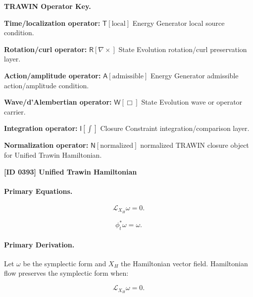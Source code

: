 \par\vspace{0.45\baselineskip}
\noindent\begin{minipage}[t]{\linewidth}
\begingroup
\small
\raggedright
\textbf{TRAWIN Operator Key.}\par
\noindent\textbf{Time/localization operator:} $\mathsf{T}\!\left[\mathrm{local}\right]$ Energy Generator local source condition.\par
\noindent\textbf{Rotation/curl operator:} $\mathsf{R}\!\left[\nabla\times\right]$ State Evolution rotation/curl preservation layer.\par
\noindent\textbf{Action/amplitude operator:} $\mathsf{A}\!\left[\mathrm{admissible}\right]$ Energy Generator admissible action/amplitude condition.\par
\noindent\textbf{Wave/d'Alembertian operator:} $\mathsf{W}\!\left[\Box\right]$ State Evolution wave or operator carrier.\par
\noindent\textbf{Integration operator:} $\mathsf{I}\!\left[\int\right]$ Closure Constraint integration/comparison layer.\par
\noindent\textbf{Normalization operator:} $\mathsf{N}\!\left[\mathrm{normalized}\right]$ normalized TRAWIN closure object for Unified Trawin Hamiltonian.\par
\endgroup
\end{minipage}

\clearpage
\noindent\textbf{[ID 0393] Unified Trawin Hamiltonian}\par
\vspace{0.35em}
\paragraph{Primary Equations.}
\begin{equation}
\mathcal{L}_{X_H}\omega=0.
\end{equation}

\begin{equation}
\phi_t^{*}\omega=\omega.
\end{equation}

\paragraph{Primary Derivation.}
Let $\omega$ be the symplectic form and $X_H$ the Hamiltonian vector field.  
Hamiltonian flow preserves the symplectic form when:

\begin{equation}
\mathcal{L}_{X_H}\omega=0.
\end{equation}

